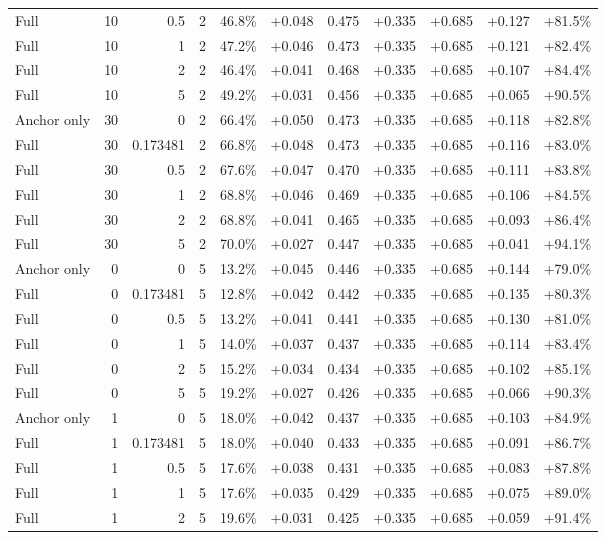 \begin{table}[htbp]
\begin{tabular}{lrrrccccccc}
Full & 10 & 0.5 & 2 & 46.8\% & +0.048 & 0.475 & +0.335 & +0.685 & +0.127 & +81.5\% \\
Full & 10 & 1 & 2 & 47.2\% & +0.046 & 0.473 & +0.335 & +0.685 & +0.121 & +82.4\% \\
Full & 10 & 2 & 2 & 46.4\% & +0.041 & 0.468 & +0.335 & +0.685 & +0.107 & +84.4\% \\
Full & 10 & 5 & 2 & 49.2\% & +0.031 & 0.456 & +0.335 & +0.685 & +0.065 & +90.5\% \\
Anchor only & 30 & 0 & 2 & 66.4\% & +0.050 & 0.473 & +0.335 & +0.685 & +0.118 & +82.8\% \\
Full & 30 & 0.173481 & 2 & 66.8\% & +0.048 & 0.473 & +0.335 & +0.685 & +0.116 & +83.0\% \\
Full & 30 & 0.5 & 2 & 67.6\% & +0.047 & 0.470 & +0.335 & +0.685 & +0.111 & +83.8\% \\
Full & 30 & 1 & 2 & 68.8\% & +0.046 & 0.469 & +0.335 & +0.685 & +0.106 & +84.5\% \\
Full & 30 & 2 & 2 & 68.8\% & +0.041 & 0.465 & +0.335 & +0.685 & +0.093 & +86.4\% \\
Full & 30 & 5 & 2 & 70.0\% & +0.027 & 0.447 & +0.335 & +0.685 & +0.041 & +94.1\% \\
Anchor only & 0 & 0 & 5 & 13.2\% & +0.045 & 0.446 & +0.335 & +0.685 & +0.144 & +79.0\% \\
Full & 0 & 0.173481 & 5 & 12.8\% & +0.042 & 0.442 & +0.335 & +0.685 & +0.135 & +80.3\% \\
Full & 0 & 0.5 & 5 & 13.2\% & +0.041 & 0.441 & +0.335 & +0.685 & +0.130 & +81.0\% \\
Full & 0 & 1 & 5 & 14.0\% & +0.037 & 0.437 & +0.335 & +0.685 & +0.114 & +83.4\% \\
Full & 0 & 2 & 5 & 15.2\% & +0.034 & 0.434 & +0.335 & +0.685 & +0.102 & +85.1\% \\
Full & 0 & 5 & 5 & 19.2\% & +0.027 & 0.426 & +0.335 & +0.685 & +0.066 & +90.3\% \\
Anchor only & 1 & 0 & 5 & 18.0\% & +0.042 & 0.437 & +0.335 & +0.685 & +0.103 & +84.9\% \\
Full & 1 & 0.173481 & 5 & 18.0\% & +0.040 & 0.433 & +0.335 & +0.685 & +0.091 & +86.7\% \\
Full & 1 & 0.5 & 5 & 17.6\% & +0.038 & 0.431 & +0.335 & +0.685 & +0.083 & +87.8\% \\
Full & 1 & 1 & 5 & 17.6\% & +0.035 & 0.429 & +0.335 & +0.685 & +0.075 & +89.0\% \\
Full & 1 & 2 & 5 & 19.6\% & +0.031 & 0.425 & +0.335 & +0.685 & +0.059 & +91.4\% \\

\end{tabular}
\end{table}
